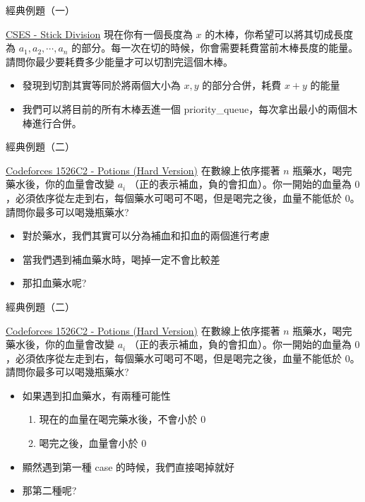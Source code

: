 \documentclass[aspectratio=169]{beamer}
\begin{document}
    \begin{frame}{經典例題（一）}
        \begin{block}{\href{https://cses.fi/problemset/task/1161}{CSES - Stick Division}}
            現在你有一個長度為 $x$ 的木棒，你希望可以將其切成長度為 $a_1, a_2, \cdots, a_n$ 的部分。每一次在切的時候，你會需要耗費當前木棒長度的能量。請問你最少要耗費多少能量才可以切割完這個木棒。
        \end{block}
        \begin{itemize}
            \item<2-> 發現到切割其實等同於將兩個大小為 $x,y$ 的部分合併，耗費 $x+y$ 的能量
            \item<3-> 我們可以將目前的所有木棒丟進一個 priority\_queue，每次拿出最小的兩個木棒進行合併。
        \end{itemize}
    \end{frame}
    
    \begin{frame}{經典例題（二）}
        \begin{block}{\href{https://codeforces.com/problemset/problem/1526/C2}{Codeforces 1526C2 - Potions (Hard Version)}}
            在數線上依序擺著 $n$ 瓶藥水，喝完藥水後，你的血量會改變 $a_i$ （正的表示補血，負的會扣血）。你一開始的血量為 $0$，必須依序從左走到右，每個藥水可喝可不喝，但是喝完之後，血量不能低於 $0$。請問你最多可以喝幾瓶藥水?
        \end{block}
        \begin{itemize}
            \item<2-> 對於藥水，我們其實可以分為補血和扣血的兩個進行考慮
            \item<3-> 當我們遇到補血藥水時，喝掉一定不會比較差
            \item<4-> 那扣血藥水呢?
        \end{itemize}
    \end{frame}
    
    \begin{frame}{經典例題（二）}
        \begin{block}{\href{https://codeforces.com/problemset/problem/1526/C2}{Codeforces 1526C2 - Potions (Hard Version)}}
            在數線上依序擺著 $n$ 瓶藥水，喝完藥水後，你的血量會改變 $a_i$ （正的表示補血，負的會扣血）。你一開始的血量為 $0$，必須依序從左走到右，每個藥水可喝可不喝，但是喝完之後，血量不能低於 $0$。請問你最多可以喝幾瓶藥水?
        \end{block}
        \begin{itemize}
            \item 如果遇到扣血藥水，有兩種可能性
            \begin{enumerate}
                \item 現在的血量在喝完藥水後，不會小於 $0$
                \item 喝完之後，血量會小於 $0$
            \end{enumerate}
            \item<2-> 顯然遇到第一種 case 的時候，我們直接喝掉就好
            \item<2-> 那第二種呢?
        \end{itemize}
    \end{frame}
    
\end{document}
